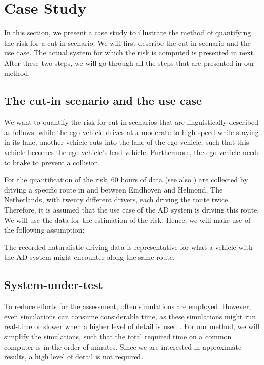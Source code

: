 \section{Case Study} %

In this section, we present a case study to illustrate the method of quantifying the risk for a cut-in scenario. We will first describe the cut-in scenario and the use case. The actual system for which the risk is computed is presented in next. After these two steps, we will go through all the steps that are presented in our method.



\subsection{The cut-in scenario and the use case}

We want to quantify the risk for cut-in scenarios that are linguistically described as follows: while the ego vehicle drives at a moderate to high speed while staying in its lane, another vehicle cuts into the lane of the ego vehicle, such that this vehicle becomes the ego vehicle's lead vehicle. Furthermore, the ego vehicle needs to brake to prevent a collision.

For the quantification of the risk, 60 hours of data (see also \cite{deGelder2017assessment}) are collected by driving a specific route in and between Eindhoven and Helmond, The Netherlands, with twenty different drivers, each driving the route twice. Therefore, it is assumed that the use case of the AD system is driving this route. We will use the data for the estimation of the risk. Hence, we will make use of the following assumption:
\begin{assumption}
	The recorded naturalistic driving data is representative for what a vehicle with the AD system might encounter along the same route.
\end{assumption}



\subsection{System-under-test}

To reduce efforts for the assessment, often simulations are employed. However, even simulations can consume considerable time, as these simulations might run real-time \cite{shah2018airsim} or slower when a higher level of detail is used \cite{zofka2016testing}. For our method, we will simplify the simulations, such that the total required time on a common computer is in the order of minutes. Since we are interested in approximate results, a high level of detail is not required. 

